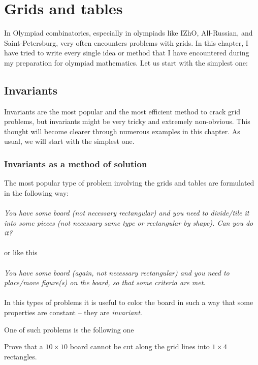 \chapter{Grids and tables}

In Olympiad combinatorics, especially in olympiads like IZhO, All-Russian, and Saint-Petersburg, very often encounters problems with grids. In this chapter, I have tried to write every single idea or method that I have encountered during my preparation for olympiad mathematics. Let us start with the simplest one:

\section{Invariants}

Invariants are the most popular and the most efficient method to crack grid problems, but invariants might be very tricky and extremely non-obvious. This thought will become clearer through numerous examples in this chapter. As usual, we will start with the simplest one.

\subsection{Invariants as a method of solution}

The most popular type of problem involving the grids and tables are formulated in the following way:
\\\\
\textit{You have some board (not necessary rectangular) and you need to divide/tile it into some pieces (not necessary same type or rectangular by shape). Can you do it?}
\\\\
or like this
\\\\
\textit{You have some board (again, not necessary rectangular) and you need to place/move figure(s) on the board, so that some criteria are met.}
\\\\
In this types of problems it is useful to color the board in such a way that some properties are constant -- they are \textit{invariant}.

One of such problems is the following one

\begin{example}
    Prove that a $10\times 10$ board cannot be cut along the grid lines into $1\times 4$ rectangles.
\end{example}

